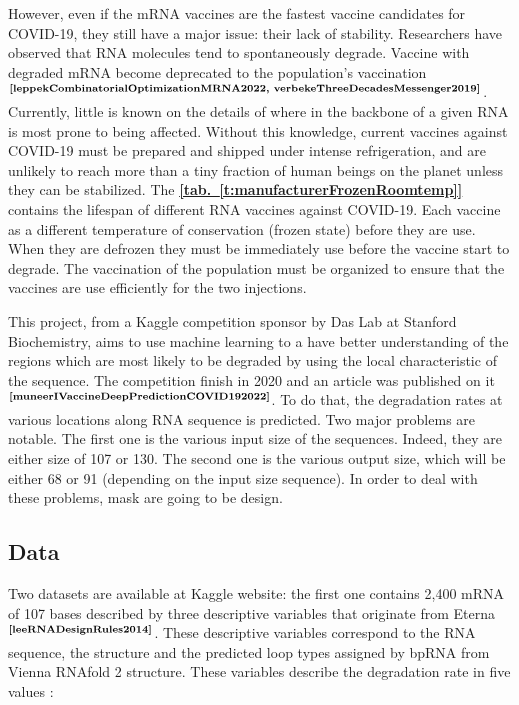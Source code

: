 \documentclass[12pt, oneside, a4paper]{report}
\newcommand{\tref}[1]{\hyperref[#1]{\textbf{[tab.~\ref*{#1}]}}}
\newcommand{\p}[1]{$^\text{#1}$}
\newcommand{\Cite}[1]{\p{\textbf{\cite{#1}}}}
\begin{document}
\begin{multicols}{2}
However, even if the mRNA vaccines are the fastest vaccine candidates for COVID-19, they still have a major issue: their lack of stability. Researchers have observed that RNA molecules tend to spontaneously degrade. Vaccine with degraded mRNA become deprecated to the population's vaccination\Cite{leppekCombinatorialOptimizationMRNA2022, verbekeThreeDecadesMessenger2019}. Currently, little is known on the details of where in the backbone of a given RNA is most prone to being affected. Without this knowledge, current vaccines against COVID-19 must be prepared and shipped under intense refrigeration, and are unlikely to reach more than a tiny fraction of human beings on the planet unless they can be stabilized. The \tref{t:manufacturerFrozenRoomtemp} contains the lifespan of different RNA vaccines against COVID-19. Each vaccine as a different temperature of conservation (frozen state) before they are use. When they are defrozen they must be immediately use before the vaccine start to degrade. The vaccination of the population must be organized to ensure that the vaccines are use efficiently for the two injections. 

This project, from a Kaggle competition sponsor by Das Lab at Stanford Biochemistry, aims to use machine learning to a have better understanding of the regions which are most likely to be degraded by using the local characteristic of the sequence. The competition finish in 2020 and an article was published on it\Cite{muneerIVaccineDeepPredictionCOVID192022}. To do that, the degradation rates at various locations along RNA sequence is predicted. Two major problems are notable. The first one is the various input size of the sequences. Indeed, they are either size of 107 or 130. The second one is the various output size, which will be  either 68 or 91 (depending on the input size sequence). In order to deal with these problems, mask are going to be design.

\subsection{Data}
Two datasets are available at Kaggle website: the first one contains 2,400 mRNA of 107 bases described by three descriptive variables that originate from Eterna\Cite{leeRNADesignRules2014}. These descriptive variables correspond to the RNA sequence, the structure and the predicted loop types assigned by bpRNA from Vienna RNAfold 2 structure. These variables describe the degradation rate in five values :


\end{multicols}
\end{document}
